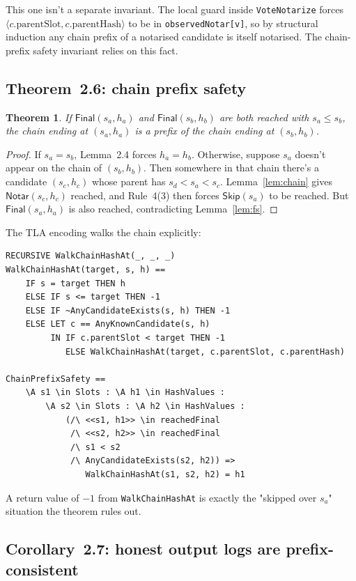 \documentclass[11pt,a4paper]{article}
\newcommand{\Notar}{\mathsf{Notar}}
\newcommand{\Skip}{\mathsf{Skip}}
\newcommand{\Final}{\mathsf{Final}}
\newtheorem{theorem}[lemma]{Theorem}
\begin{document}
This one isn't a separate invariant. The local guard inside
\verb|VoteNotarize| forces
$\langle c.\mathrm{parentSlot}, c.\mathrm{parentHash}\rangle$ to be in
\verb|observedNotar[v]|, so by structural induction any chain prefix of
a notarised candidate is itself notarised. The chain-prefix safety
invariant relies on this fact.

\subsection{Theorem~2.6: chain prefix safety}

\begin{theorem}\label{th:safety}
If $\Final(s_a, h_a)$ and $\Final(s_b, h_b)$ are both reached with
$s_a \le s_b$, the chain ending at $(s_a, h_a)$ is a prefix of the
chain ending at $(s_b, h_b)$.
\end{theorem}
\begin{proof}
If $s_a = s_b$, Lemma~2.4 forces $h_a = h_b$. Otherwise, suppose
$s_a$ doesn't appear on the chain of $(s_b, h_b)$. Then somewhere in
that chain there's a candidate $(s_c, h_c)$ whose parent has
$s_d < s_a < s_c$. Lemma~\ref{lem:chain} gives $\Notar(s_c, h_c)$
reached, and Rule~4(3) then forces $\Skip(s_a)$ to be reached. But
$\Final(s_a, h_a)$ is also reached, contradicting Lemma~\ref{lem:fs}.
\end{proof}

The TLA encoding walks the chain explicitly:

\begin{lstlisting}
RECURSIVE WalkChainHashAt(_, _, _)
WalkChainHashAt(target, s, h) ==
    IF s = target THEN h
    ELSE IF s <= target THEN -1
    ELSE IF ~AnyCandidateExists(s, h) THEN -1
    ELSE LET c == AnyKnownCandidate(s, h)
         IN IF c.parentSlot < target THEN -1
            ELSE WalkChainHashAt(target, c.parentSlot, c.parentHash)

ChainPrefixSafety ==
    \A s1 \in Slots : \A h1 \in HashValues :
        \A s2 \in Slots : \A h2 \in HashValues :
            (/\ <<s1, h1>> \in reachedFinal
             /\ <<s2, h2>> \in reachedFinal
             /\ s1 < s2
             /\ AnyCandidateExists(s2, h2)) =>
                WalkChainHashAt(s1, s2, h2) = h1
\end{lstlisting}

A return value of $-1$ from \verb|WalkChainHashAt| is exactly the
"skipped over $s_a$" situation the theorem rules out.

\subsection{Corollary~2.7: honest output logs are prefix-consistent}
\end{document}
